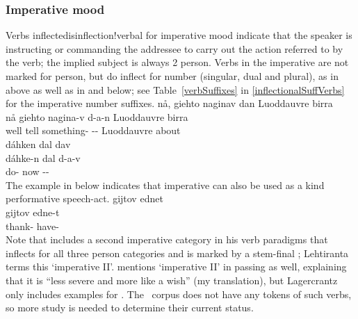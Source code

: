 \subsubsection{Imperative mood}\label{IMPmood}
Verbs inflectedis{inflection!verbal} for imperative mood indicate that the speaker is instructing or commanding the addressee to carry out the action referred to by the verb; the implied subject is always 2 person. Verbs in the imperative are not marked for person, but do inflect for number (singular, dual and plural), as in  above as well as in  and  below; see Table~\vref{verbSuffixes} in \SEC\ref{inflectionalSuffVerbs} for the imperative number suffixes. %
\ea\label{imperativeEx1}%
\glll	nå, giehto naginav dan Luoddauvre birra\\
	nå giehto nagina-v d-a-n Luoddauvre birra\\
	well tell\BS{} something- -- Luoddauvre\BS{} about\\\nopagebreak
{}	
\z
\ea\label{imperativeEx2}%
\glll	dáhken dal dav\\
	dáhke-n dal d-a-v\\
	do- now --\\\nopagebreak
{}	
\z
The example in  below indicates that imperative can also be used as a kind performative speech-act. 
\ea\label{imperativeEx3}%
\glll	gijtov ednet\\
	gijtov edne-t\\
	thank- have-\\\nopagebreak
{}	
\z
Note that \citet[150--155]{Lehtiranta1992} includes a second imperative category in his verb paradigms that inflects for all three person categories and is marked by a stem-final ; Lehtiranta terms this ‘imperative II’. \citet[22]{Lagercrantz1926} mentions ‘imperative II’ in passing as well, explaining that it is “less severe and more like a wish” (my translation), but  Lagercrantz only includes examples for \SGs. %
The \PSDP\ corpus does not have any tokens of such verbs, so more study is needed to determine their current status. 


